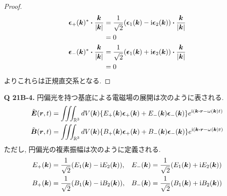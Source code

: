 \documentclass[a4paper,dvipdfmx]{jsarticle}
\theoremstyle{definition}
\begin{document}
\begin{proof}
\begin{align}
    \ee_+(\kk)^*\vdot\frac{\kk}{|\kk|}                     & = \frac{1}{\sqrt{2}}(\ee_1(\kk) - \ii\ee_2(\kk))\vdot\frac{\kk}{|\kk|}     \\
                                                           & = 0                                                                        \\
    \ee_-(\kk)^*\vdot\frac{\kk}{|\kk|}                     & = \frac{1}{\sqrt{2}}(\ee_1(\kk) + \ii\ee_2(\kk))\vdot\frac{\kk}{|\kk|}     \\
                                                           & = 0
  \end{align}
  よりこれらは正規直交系となる.
\end{proof}

\textbf{Q 21B-4.} 円偏光を持つ基底による電磁場の展開は次のように表される.
\begin{align}
  \tilde{\EE}(\rr, t) & = \iiint_{\RR^3} dV(\kk)\qty{E_+(\kk)\ee_+(\kk) + E_-(\kk)\ee_-(\kk)}e^{\ii(\kk\vdot\rr - \omega(\kk)t)} \\
  \tilde{\BB}(\rr, t) & = \iiint_{\RR^3} dV(\kk)\qty{B_+(\kk)\ee_+(\kk) + B_-(\kk)\ee_-(\kk)}e^{\ii(\kk\vdot\rr - \omega(\kk)t)}
\end{align}
ただし, 円偏光の複素振幅は次のように定義される.
\begin{align}
  E_+(\vb*{k}) & = \frac{1}{\sqrt{2}}\qty(E_1(\vb*{k}) - \mathrm{i} E_2(\vb*{k})), & E_-(\vb*{k}) & = \frac{1}{\sqrt{2}}\qty(E_1(\vb*{k}) + \mathrm{i} E_2(\vb*{k})) \\
  B_+(\vb*{k}) & = \frac{1}{\sqrt{2}}\qty(B_1(\vb*{k}) - \mathrm{i} B_2(\vb*{k})), & B_-(\vb*{k}) & = \frac{1}{\sqrt{2}}\qty(B_1(\vb*{k}) + \mathrm{i} B_2(\vb*{k}))
\end{align}
\end{document}
